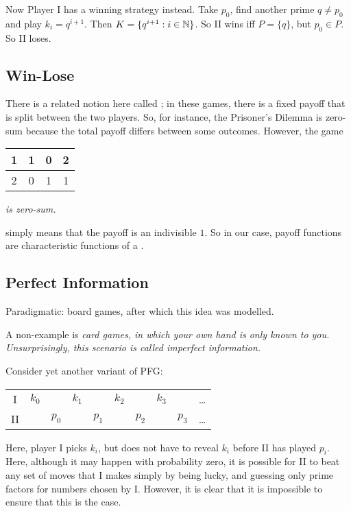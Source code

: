 \documentclass[]{article}
\begin{document}
Now Player I has a winning strategy instead. Take $p_0$, find another prime $q \ne p_0$ and play $k_i = q^{i+1}$. Then $K = \{q^{i+1}:i \in \mathbb{N}\}$. So II wins iff $P = \{q\}$, but $p_0 \in P$. So II loses.

\subsection{Win-Lose}

There is a related notion here called ; in these games, there is a fixed payoff that is split between the two players. So, for instance, the Prisoner's Dilemma is  zero-sum because the total payoff differs between some outcomes. However, the game
\begin{center}
    \begin{tabular}{cc|cc}
        1&1&0&2\\ \hline
        2&0&1&1
    \end{tabular}
\end{center}
\it{is} zero-sum.

 simply means that the payoff is an indivisible $1$. So in our case, payoff functions are characteristic functions of a .

\subsection{Perfect Information}

Paradigmatic: board games, after which this idea was modelled.

A non-example is \it{card games}, in which your own hand is only known to you. Unsurprisingly, this scenario is called \it{imperfect information}.

Consider yet another variant of PFG:

\begin{center}
    \begin{tabular}{cccccccccc}
        I & $k_0$ & & $k_1$ & & $k_2$ & & $k_3$ & &\dots \\
        II & & $p_0$ & & $p_1$ & & $p_2$ & & $p_3$ &\dots
    \end{tabular}
\end{center}

Here, player I picks $k_i$, but does not have to reveal $k_i$ before II has played $p_i$. Here, although it may happen with probability zero, it is possible for II to beat any set of moves that I makes simply by being lucky, and guessing only prime factors for numbers chosen by I. However, it is clear that it is impossible to ensure that this is the case.
\end{document}
